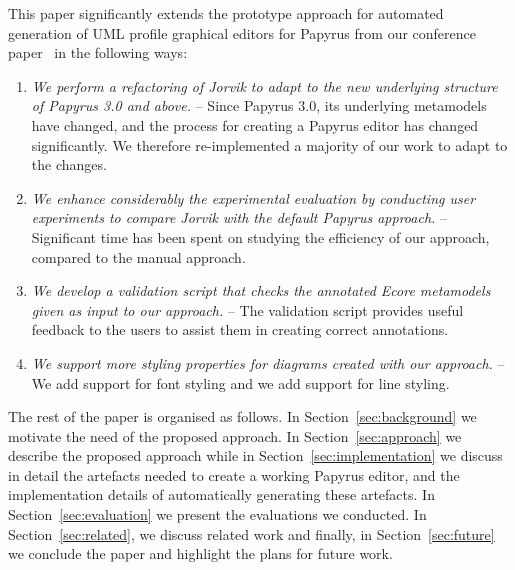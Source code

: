 This paper significantly extends the prototype approach for automated generation of UML profile graphical editors for Papyrus from our conference paper~\cite{zolotas2018towards} in the following ways:
\begin{enumerate}
	\item \textit{We perform a refactoring of \textit{Jorvik} to adapt to the new underlying structure of Papyrus 3.0 and above.} --
	Since Papyrus 3.0, its underlying metamodels have changed, and the process for creating a Papyrus editor has changed significantly. 
	We therefore re-implemented a majority of our work to adapt to the changes. 
	\item \textit{We enhance considerably the experimental evaluation by conducting user experiments to compare \textit{Jorvik} with the default Papyrus approach.} --
	Significant time has been spent on studying the efficiency of our approach, compared to the manual approach.
	\item \textit{We develop a validation script that checks the annotated Ecore metamodels given as input to our approach.} -- The validation script provides useful feedback to the users to assist them in creating correct annotations.
	\item \textit{We support more styling properties for diagrams created with our approach.} -- We add support for font styling and we add support for line styling.
\end{enumerate}
The rest of the paper is organised as follows. 
In Section~\ref{sec:background} we motivate the need of the proposed approach. 
In Section~\ref{sec:approach} we describe the proposed approach while 
in Section~\ref{sec:implementation} we discuss in detail the artefacts needed to create a working Papyrus editor, and the implementation details of automatically generating these artefacts. 
In Section~\ref{sec:evaluation} we present the evaluations we conducted.
In Section~\ref{sec:related}, we discuss related work and finally, in Section~\ref{sec:future} we conclude the paper and highlight the plans for future work.